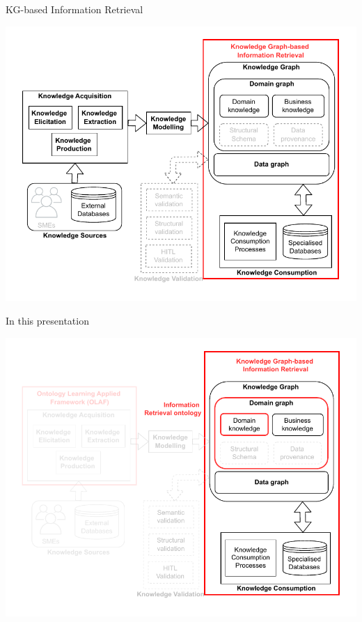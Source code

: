 \begin{frame}{KG-based Information Retrieval}

        \begin{center}
            \includegraphics[scale=0.6]{images/KGBS-knowledge-consumption-industrial-exp.pdf} 
        \end{center}

\end{frame}

\begin{frame}{In this presentation}

        \begin{center}
            \includegraphics[scale=0.6]{images/KGBS-architecture-focus-TP-expe-IR-onto.pdf} 
        \end{center}

\end{frame}